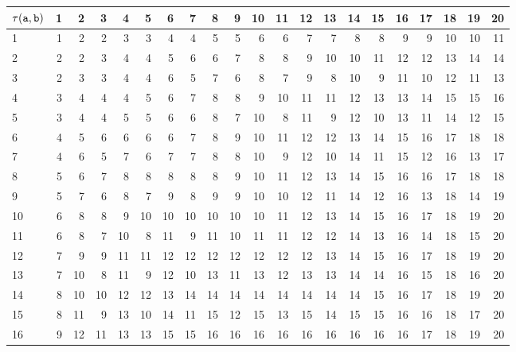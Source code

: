 \begin{tabular}{l|rrrrrrrrrrrrrrrrrrrr}
 $\tau(\mathtt{a},\mathtt{b})$ &  1 &  2 &  3 &  4 &  5 &  6 &  7 &  8 &  9 & 10 & 11 & 12 & 13 & 14 & 15 & 16 & 17 & 18 & 19 & 20 \\
\hline
 1        &  1 &  2 &  2 &  3 &  3 &  4 &  4 &  5 &  5 &  6 &  6 &  7 &  7 &  8 &  8 &  9 &  9 & 10 & 10 & 11 \\
 2        &  2 &  2 &  3 &  4 &  4 &  5 &  6 &  6 &  7 &  8 &  8 &  9 & 10 & 10 & 11 & 12 & 12 & 13 & 14 & 14 \\
 3        &  2 &  3 &  3 &  4 &  4 &  6 &  5 &  7 &  6 &  8 &  7 &  9 &  8 & 10 &  9 & 11 & 10 & 12 & 11 & 13 \\
 4        &  3 &  4 &  4 &  4 &  5 &  6 &  7 &  8 &  8 &  9 & 10 & 11 & 11 & 12 & 13 & 13 & 14 & 15 & 15 & 16 \\
 5        &  3 &  4 &  4 &  5 &  5 &  6 &  6 &  8 &  7 & 10 &  8 & 11 &  9 & 12 & 10 & 13 & 11 & 14 & 12 & 15 \\
 6        &  4 &  5 &  6 &  6 &  6 &  6 &  7 &  8 &  9 & 10 & 11 & 12 & 12 & 13 & 14 & 15 & 16 & 17 & 18 & 18 \\
 7        &  4 &  6 &  5 &  7 &  6 &  7 &  7 &  8 &  8 & 10 &  9 & 12 & 10 & 14 & 11 & 15 & 12 & 16 & 13 & 17 \\
 8        &  5 &  6 &  7 &  8 &  8 &  8 &  8 &  8 &  9 & 10 & 11 & 12 & 13 & 14 & 15 & 16 & 16 & 17 & 18 & 18 \\
 9        &  5 &  7 &  6 &  8 &  7 &  9 &  8 &  9 &  9 & 10 & 10 & 12 & 11 & 14 & 12 & 16 & 13 & 18 & 14 & 19 \\
 10       &  6 &  8 &  8 &  9 & 10 & 10 & 10 & 10 & 10 & 10 & 11 & 12 & 13 & 14 & 15 & 16 & 17 & 18 & 19 & 20 \\
 11       &  6 &  8 &  7 & 10 &  8 & 11 &  9 & 11 & 10 & 11 & 11 & 12 & 12 & 14 & 13 & 16 & 14 & 18 & 15 & 20 \\
 12       &  7 &  9 &  9 & 11 & 11 & 12 & 12 & 12 & 12 & 12 & 12 & 12 & 13 & 14 & 15 & 16 & 17 & 18 & 19 & 20 \\
 13       &  7 & 10 &  8 & 11 &  9 & 12 & 10 & 13 & 11 & 13 & 12 & 13 & 13 & 14 & 14 & 16 & 15 & 18 & 16 & 20 \\
 14       &  8 & 10 & 10 & 12 & 12 & 13 & 14 & 14 & 14 & 14 & 14 & 14 & 14 & 14 & 15 & 16 & 17 & 18 & 19 & 20 \\
 15       &  8 & 11 &  9 & 13 & 10 & 14 & 11 & 15 & 12 & 15 & 13 & 15 & 14 & 15 & 15 & 16 & 16 & 18 & 17 & 20 \\
 16       &  9 & 12 & 11 & 13 & 13 & 15 & 15 & 16 & 16 & 16 & 16 & 16 & 16 & 16 & 16 & 16 & 17 & 18 & 19 & 20 \\

\end{tabular}

